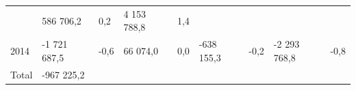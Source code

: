 \begin{longtable}[]{@{}lllllllll@{}}
\begin{minipage}[t]{0.06\columnwidth}
\end{minipage} & \begin{minipage}[t]{0.12\columnwidth}\raggedright
586 706,2\strut
\end{minipage} & \begin{minipage}[t]{0.06\columnwidth}\raggedright
0,2\strut
\end{minipage} & \begin{minipage}[t]{0.10\columnwidth}\raggedright
4 153 788,8\strut
\end{minipage} & \begin{minipage}[t]{0.06\columnwidth}\raggedright
1,4\strut
\end{minipage}\tabularnewline
\begin{minipage}[t]{0.05\columnwidth}\raggedright
2014\strut
\end{minipage} & \begin{minipage}[t]{0.10\columnwidth}\raggedright
-1 721 687,5\strut
\end{minipage} & \begin{minipage}[t]{0.06\columnwidth}\raggedright
-0,6\strut
\end{minipage} & \begin{minipage}[t]{0.16\columnwidth}\raggedright
66 074,0\strut
\end{minipage} & \begin{minipage}[t]{0.06\columnwidth}\raggedright
0,0\strut
\end{minipage} & \begin{minipage}[t]{0.12\columnwidth}\raggedright
-638 155,3\strut
\end{minipage} & \begin{minipage}[t]{0.06\columnwidth}\raggedright
-0,2\strut
\end{minipage} & \begin{minipage}[t]{0.10\columnwidth}\raggedright
-2 293 768,8\strut
\end{minipage} & \begin{minipage}[t]{0.06\columnwidth}\raggedright
-0,8\strut
\end{minipage}\tabularnewline
\begin{minipage}[t]{0.05\columnwidth}\raggedright
Total\strut
\end{minipage} & \begin{minipage}[t]{0.10\columnwidth}\raggedright
-967 225,2\strut
\end{minipage} & \begin{minipage}[t]{0.06\columnwidth}\raggedright
\strut
\end{minipage} & \begin{minipage}[t]{0.16\columnwidth}\raggedright

\end{minipage}
\end{longtable}
